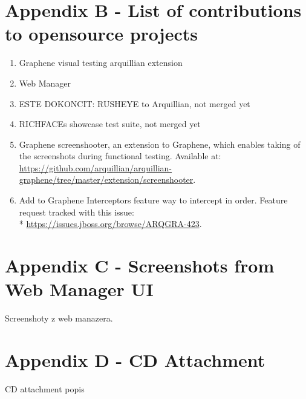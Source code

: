 \documentclass[11pt,oneside,final]{fithesis2}
\begin{document}
\chapter{Appendix B - List of contributions to opensource projects}
\label{appendix:b}
\begin{enumerate}
 \item Graphene visual testing arquillian extension
 \item Web Manager
 \item ESTE DOKONCIT: RUSHEYE to Arquillian, not merged yet
 \item RICHFACEs showcase test suite, not merged yet
 \item Graphene screenshooter, an extension to Graphene, which enables taking of the screenshots during functional testing.
       Available at: \url{https://github.com/arquillian/arquillian-graphene/tree/master/extension/screenshooter}.
 \item Add to Graphene Interceptors feature way to intercept in order. Feature request tracked with this issue:\\*
       \url{https://issues.jboss.org/browse/ARQGRA-423}.
\end{enumerate}


\chapter{Appendix C - Screenshots from Web Manager UI}
\label{appendix:c}
Screenshoty z web manazera.

\chapter{Appendix D - CD Attachment}
\label{appendix:d}
CD attachment popis
\end{document}
